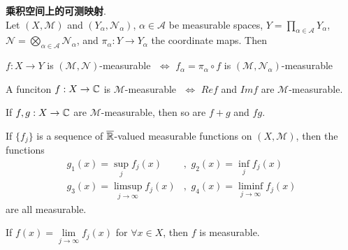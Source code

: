	\newpage
	
	\begin{proposition}\label{prop 3.1.3}
		\textbf{乘积空间上的可测映射}. \\
		Let $(X , \mathcal{M})$ and $(Y_\alpha , \mathcal{N}_\alpha)$, $\alpha \in \mathcal{A}$ be measurable spaces, $Y = \prod_{\alpha \in \mathcal{A}}{Y_\alpha}$, $\mathcal{N} = \bigotimes_{\alpha \in \mathcal{A}}{\mathcal{N}_\alpha}$, and $\pi_{\alpha} : Y \rightarrow Y_\alpha$ the coordinate maps. Then
		\begin{center}
			$f : X \rightarrow Y$ is $(\mathcal{M} , \mathcal{N})$-measurable $\,\, \Leftrightarrow \,\, f_{\alpha} = \pi_\alpha \circ f$ is $(\mathcal{M} , \mathcal{N}_\alpha)$-measurable
		\end{center}
	\end{proposition}
	
	\vspace*{6em}
	
	\begin{corollary}\label{cor 3.1.2}
		A funciton $f : X \rightarrow \mathbb{C}$ is $\mathcal{M}$-measurable $\,\, \Leftrightarrow \,\, Ref$ and $Imf$ are $\mathcal{M}$-measurable.
	\end{corollary}
	
	\vspace*{6em}
	
	\begin{proposition}\label{prop 3.1.4}
		If $f , g : X \rightarrow \mathbb{C}$ are $\mathcal{M}$-measurable, then so are $f + g$ and $fg$.
	\end{proposition}
	
	\vspace*{6em}
	
	\begin{proposition}\label{prop 3.1.5}
		If $\{ f_j \}$ is a sequence of $\overline{\mathbb{R}}$-valued measurable functions on $(X , \mathcal{M})$, then the functions
		\begin{align}
			g_1 (x) = \sup_{j}{f_{j}(x)} &, \,\, g_2 (x) = \inf_{j}{f_{j}(x)} \\
			g_3 (x) = \limsup_{j \to \infty}{f_{j}(x)} &, \,\, g_4 (x) = \liminf_{j \to \infty}{f_{j}(x)}
		\end{align}
		are all measurable. 
		\begin{center}
			If $f(x) = \underset{j \to \infty}{\lim}{f_{j}(x)}$ for $\forall x \in X$, then $f$ is measurable.
		\end{center}
	\end{proposition}


